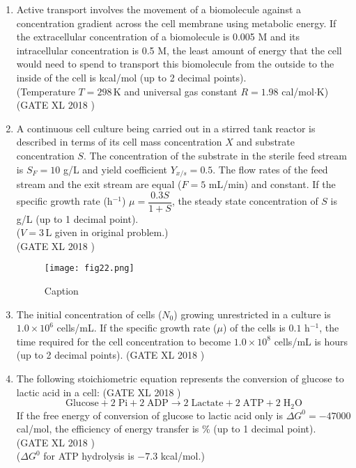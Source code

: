 \documentclass[14pt]{extarticle}
\begin{document}
\begin{flushleft}
\begin{enumerate}
\item Active transport involves the movement of a biomolecule against a concentration gradient across the cell membrane using metabolic energy. If the extracellular concentration of a biomolecule is 0.005 M and its intracellular concentration is 0.5 M, the least amount of energy that the cell would need to spend to transport this biomolecule from the outside to the inside of the cell is \underline{\hspace{4cm}} kcal/mol (up to 2 decimal points).\\
(Temperature $T = 298\,$K and universal gas constant $R = 1.98$ cal/mol$\cdot$K)
\hfill(GATE XL 2018 )\\

\item A continuous cell culture being carried out in a stirred tank reactor is described in terms of its cell mass concentration $X$ and substrate concentration $S$. The concentration of the substrate in the sterile feed stream is $S_F = 10$ g/L and yield coefficient $Y_{x/s} = 0.5$. The flow rates of the feed stream and the exit stream are equal ($F = 5$ mL/min) and constant. If the specific growth rate (h$^{-1}$) $\mu = \dfrac{0.3 S}{1+S}$, the steady state concentration of $S$ is \underline{\hspace{3cm}} g/L (up to 1 decimal point).\\
($V = 3\,$L given in original problem.)\\
\hfill(GATE XL 2018 )\\
\begin{figure}[H]
    \centering
    \texttt{[image: fig22.png]}
    \caption{Caption}
    \label{fig:q18}
\end{figure}

\item The initial concentration of cells ($N_0$) growing unrestricted in a culture is $1.0\times10^{6}$ cells/mL. If the specific growth rate ($\mu$) of the cells is $0.1$ h$^{-1}$, the time required for the cell concentration to become $1.0\times10^{8}$ cells/mL is \underline{\hspace{3cm}} hours (up to 2 decimal points).
\hfill(GATE XL 2018 )\\

\item The following stoichiometric equation represents the conversion of glucose to lactic acid in a cell:
\hfill(GATE XL 2018 )\\
\[
\text{Glucose} + 2\;\text{Pi} + 2\;\text{ADP} \longrightarrow 2\;\text{Lactate} + 2\;\text{ATP} + 2\;\text{H}_2\text{O}
\]
If the free energy of conversion of glucose to lactic acid only is $\Delta G^0 = -47000$ cal/mol, the efficiency of energy transfer is \underline{\hspace{2.5cm}} \% (up to 1 decimal point).\\
\hfill(GATE XL 2018 )\\
($\Delta G^0$ for ATP hydrolysis is $-7.3$ kcal/mol.)


\end{enumerate}
\end{flushleft}
\end{document}
